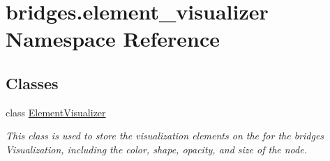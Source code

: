 \hypertarget{namespacebridges_1_1element__visualizer}{}\section{bridges.\+element\+\_\+visualizer Namespace Reference}
\label{namespacebridges_1_1element__visualizer}
\subsection*{Classes}
\begin{DoxyCompactItemize}
\item 
class \hyperlink{classbridges_1_1element__visualizer_1_1_element_visualizer}{Element\+Visualizer}
\begin{DoxyCompactList}\small\item\em This class is used to store the visualization elements on the for the bridges Visualization, including the color, shape, opacity, and size of the node. \end{DoxyCompactList}\end{DoxyCompactItemize}
